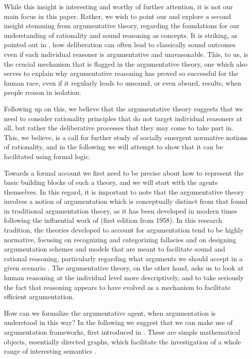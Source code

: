 \documentclass[greybox]{svmult}
\begin{document}
While this insight is interesting and worthy of further attention, it is not our main focus in this paper. Rather, we wish to point our and explore a second insight stemming from argumentative theory, regarding the 
foundations for our understanding of rationality and sound reasoning as concepts. It is striking, as pointed out in \cite{mercier}, how deliberation can often lead to classically sound outcomes even if each individual reasoner is  argumentative and unreasonable. This, to us, is the crucial mechanism that is flagged in the argumentative theory, one which also serves to explain why argumentative reasoning has proved so successful for the human race, even if it regularly leads to unsound, or even absurd, results, when people reason in isolation. 

Following up on this, we believe that the argumentative theory suggests that we need to consider rationality principles that do not target individual reasoners at all, but rather the deliberative processes that they may come to take part in. This, we believe, is a call for further study of socially emergent normative notions of rationality, and in the following we will attempt to show that it can be facilitated using formal logic.

Towards a formal account we first need to be precise about how to represent the basic building blocks of such a theory, and we will start with the agents themselves. In this regard, it is important to note that the argumentative theory involves a notion of argumentation which is conceptually distinct from that found in traditional argumentation theory, as it has been developed in modern times following the influential work of \cite{toulmin} (first edition from 1958). In this research tradition, the theories developed to account for argumentation tend to be highly normative, focusing on recognizing and categorizing fallacies and on designing argumentation schemes and models that are meant to facilitate sound and rational reasoning, particularly regarding what arguments we should accept in a given scenario \cite{....,.....}. The argumentative theory, on the other hand, asks us to look at human reasoning at the individual level more descriptively, and to take seriously the fact that reasoning appears to have evolved as a mechanism to facilitate efficient argumentation.

How can we formalize the argumentative agent, when argumentation is understood in this way? In the following we suggest that we can make use of argumentation frameworks, first introduced in \cite{dung}. These are simple mathematical objects, essentially directed graphs, which facilitate the investigation of a whole range of interesting semantics \cite{baroni}.
\end{document}
